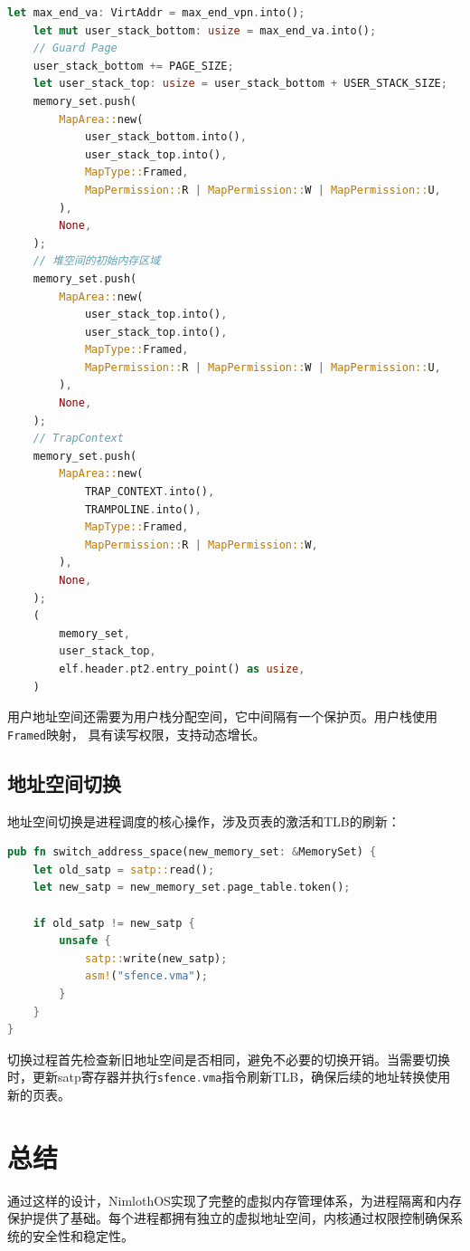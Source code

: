 \begin{lstlisting}[language=Rust,caption={用户栈映射}, label={lst:user-stack-map}]
    let max_end_va: VirtAddr = max_end_vpn.into();
    let mut user_stack_bottom: usize = max_end_va.into();
    // Guard Page
    user_stack_bottom += PAGE_SIZE;
    let user_stack_top: usize = user_stack_bottom + USER_STACK_SIZE;
    memory_set.push(
        MapArea::new(
            user_stack_bottom.into(),
            user_stack_top.into(),
            MapType::Framed,
            MapPermission::R | MapPermission::W | MapPermission::U,
        ),
        None,
    );
    // 堆空间的初始内存区域
    memory_set.push(
        MapArea::new(
            user_stack_top.into(),
            user_stack_top.into(),
            MapType::Framed,
            MapPermission::R | MapPermission::W | MapPermission::U,
        ),
        None,
    );
    // TrapContext
    memory_set.push(
        MapArea::new(
            TRAP_CONTEXT.into(),
            TRAMPOLINE.into(),
            MapType::Framed,
            MapPermission::R | MapPermission::W,
        ),
        None,
    );
    (
        memory_set,
        user_stack_top,
        elf.header.pt2.entry_point() as usize,
    )
\end{lstlisting}

用户地址空间还需要为用户栈分配空间，它中间隔有一个保护页。用户栈使用\lstinline[language=Rust]{Framed}映射，
具有读写权限，支持动态增长。

\subsection{地址空间切换}

地址空间切换是进程调度的核心操作，涉及页表的激活和TLB的刷新：

\begin{lstlisting}[language=Rust,caption={地址空间切换机制}, label={lst:address-space-switch}]
pub fn switch_address_space(new_memory_set: &MemorySet) {
    let old_satp = satp::read();
    let new_satp = new_memory_set.page_table.token();
    
    if old_satp != new_satp {
        unsafe {
            satp::write(new_satp);
            asm!("sfence.vma");
        }
    }
}
\end{lstlisting}

切换过程首先检查新旧地址空间是否相同，避免不必要的切换开销。当需要切换时，更新satp寄存器并执行\lstinline[language=Rust]{sfence.vma}指令刷新TLB，确保后续的地址转换使用新的页表。

\section{总结}

通过这样的设计，NimlothOS实现了完整的虚拟内存管理体系，为进程隔离和内存保护提供了基础。每个进程都拥有独立的虚拟地址空间，内核通过权限控制确保系统的安全性和稳定性。